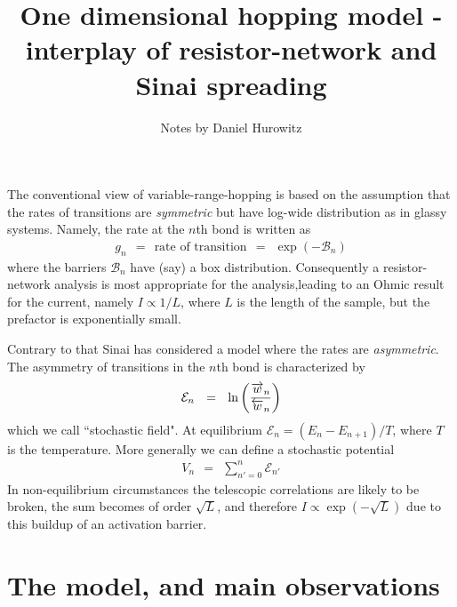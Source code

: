 \documentclass[aps,pre,floats,floatfix,fleqn,notitlepage]{revtex4-1}
\newcommand{\beq}{\begin{eqnarray}}
\newcommand{\eeq}{\end{eqnarray}}
\newcommand{\ola}{\protect\overleftarrow}
\newcommand{\ora}{\protect\overrightarrow}
\begin{document}
\title{One dimensional hopping model - interplay of resistor-network and Sinai spreading}

\author{Notes by Daniel Hurowitz}

\maketitle
The conventional view of variable-range-hopping is based on the assumption 
that the rates of transitions are {\em symmetric} 
but have log-wide distribution as in glassy systems. 
Namely, the rate at the $n$th bond is written as 
%
\beq 
g_n \ \ = \ \ \text{rate of transition} \ \ = \ \ \exp(-\mathcal{B}_n)
\eeq
% 
where the barriers $\mathcal{B}_n$ have (say) a box distribution.
Consequently a resistor-network analysis is most appropriate for the 
analysis,leading to an Ohmic result for the current, namely $I\propto 1/L$,  
where $L$ is the length of the sample, but the prefactor is exponentially small. 

Contrary to that Sinai has considered a model where the rates are {\em asymmetric}. 
The asymmetry of transitions in the $n$th bond is characterized by   
%
\beq
\mathcal{E}_n \ \ = \ \ \ln\left( \frac{\ora{w}_{n}}{\ola{w}_{n}} \right)  
\eeq
%  
which we call ``stochastic field". 
At equilibrium $\mathcal{E}_n = (E_{n}-E_{n+1})/T$, 
where $T$ is the temperature.  
More generally we can define a stochastic potential 
%
\beq
V_n \ \ = \ \ \sum_{n'=0}^n \mathcal{E}_{n'}
\eeq
% 
In non-equilibrium circumstances the telescopic correlations are likely 
to be broken, the sum becomes of order $\sqrt{L}$,   
and therefore $I\propto \exp(-\sqrt{L})$ due to this buildup 
of an activation barrier. 
    

\section{The model, and main observations}
\end{document}
